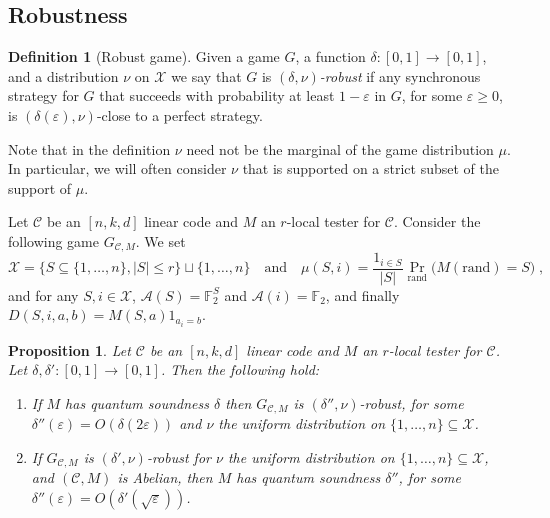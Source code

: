 \documentclass[11pt]{article}
\newtheorem{proposition}[theorem]{Proposition}
\theoremstyle{definition}
\newtheorem{definition}[theorem]{Definition}
\newcommand{\code}{\mathcal{C}}
\newcommand{\field}{\mathbb{F}_2}
\newcommand{\mA}{\ensuremath{\mathcal{A}}}
\newcommand{\mC}{\ensuremath{\mathcal{C}}}
\newcommand{\mX}{\ensuremath{\mathcal{X}}}
\newcommand{\rand}{\textrm{rand}}
\newcommand{\eps}{\varepsilon}
\begin{document}
\subsection{Robustness}


\begin{definition}[Robust game]
Given a game $G$, a function $\delta:[0,1]\to[0,1]$, and a distribution $\nu$ on $\mX$ we say that $G$ is \emph{$(\delta,\nu)$-robust} if any synchronous strategy for $G$ that succeeds with probability at least $1-\eps$ in $G$, for some $\eps\geq 0$, is
 $(\delta(\eps),\nu)$-close to a perfect strategy.
\end{definition}

Note that in the definition $\nu$ need not be the marginal of the game distribution $\mu$. In particular, we will often consider $\nu$ that is supported on a strict subset of the support of $\mu$. 

Let $\code$ be an $[n,k,d]$ linear code and $M$ an $r$-local tester for $\code$. Consider the following game $G_{\code,M}$. We set 
\[\mX = \{ S\subseteq \{1,\ldots,n\},|S|\leq r\} \sqcup\{1,\ldots,n\}\quad\text{and}\quad \mu(S,i)=\frac{1_{i\in S}}{|S|}\Pr_\rand\big(M(\rand)=S\big)\;,\]
and for any $S,i\in\mX$, $\mA(S)=\field^S$ and $\mA(i)=\field$, and finally $D(S,i,a,b)=M(S,a)1_{a_i=b}$. 



\begin{proposition}\label{prop:sound-game}
Let $\code$ be an $[n,k,d]$ linear code and $M$ an $r$-local tester for $\code$. Let $\delta,\delta':[0,1]\to[0,1]$. Then the following hold:
\begin{enumerate}
\item If $M$ has quantum soundness $\delta$ then $G_{\code,M}$  is $(\delta'',\nu)$-robust, for some $\delta''(\eps)=O({\delta(2\eps)})$ and $\nu$ the uniform distribution on $\{1,\ldots,n\}\subseteq \mX$. 
\item If $G_{\code,M}$ is $(\delta',\nu)$-robust for $\nu$ the uniform distribution on $\{1,\ldots,n\}\subseteq \mX$, and $(\mC,M)$ is Abelian, then $M$ has quantum soundness $\delta''$, for some $\delta''(\eps) = O(\delta'(\sqrt{\eps}))$. 
\end{enumerate}
\end{proposition}
\end{document}
